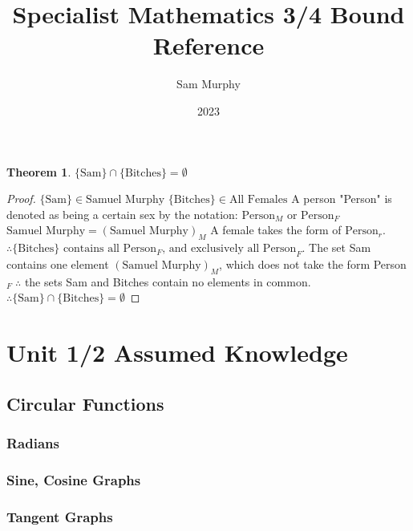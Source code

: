 \documentclass[a4paper]{article}
\title {Specialist Mathematics 3/4 Bound Reference}
\author {Sam Murphy}
\date{2023}
\begin{document}
	\maketitle	
	\newtheorem{bitchesTheorem}{Theorem}
	\begin{bitchesTheorem}
		$\{\text{Sam}\}\cap\{\text{Bitches}\}=\emptyset$
	\end{bitchesTheorem}
	\begin{proof}
		$\{\text{Sam}\}\in\text{Samuel Murphy}$\newline
		$\{\text{Bitches}\}\in\text{All Females}$\newline\newline
		A person "Person" is denoted as being a certain sex by the notation: $\text{Person}_M\text{ or Person}_F$\newline\newline
		$\text{Samuel Murphy}=(\text{Samuel Murphy})_M$\newline\newline
		A female takes the form of $\text{Person}_r$. $\therefore \{\text{Bitches}\}\text{ contains all Person}_F\text{, and exclusively all Person}_F$.\newline\newline
		The set {Sam} contains one element $(\text{Samuel Murphy})_M$, which does not take the form Person$_F\;\therefore$ the sets {Sam} and {Bitches} contain no elements in common.\newline
		$\therefore\{\text{Sam}\}\cap\{\text{Bitches}\}=\emptyset$
	\end{proof}
	\newpage
	\tableofcontents
	\newpage
	\section{Unit 1/2 Assumed Knowledge}
		\subsection{Circular Functions}
			\subsubsection{Radians}
			\subsubsection{Sine, Cosine Graphs}
			\subsubsection{Tangent Graphs}
\end{document}

